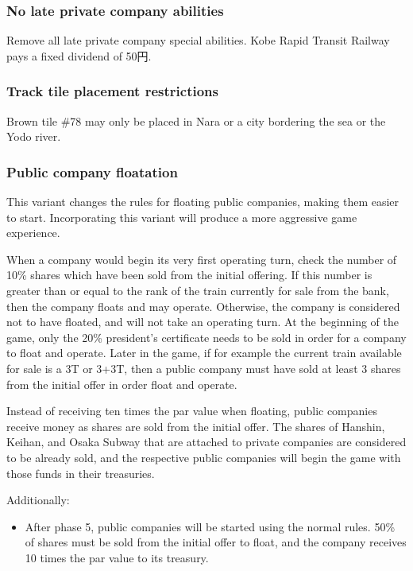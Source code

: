 \documentclass{article}
\begin{document}
\begin{CJK}{UTF8}{min}
\begin{multicols}{2}
\subsubsection{No late private company abilities}
Remove all late private company special abilities. Kobe Rapid Transit
Railway pays a fixed dividend of 50円.

\subsubsection{Track tile placement restrictions}
Brown tile \#78 may only be placed in Nara or a city bordering the sea
or the Yodo river.

\subsubsection{Public company floatation}
This variant changes the rules for floating public companies, making
them easier to start. Incorporating this variant will produce a more
aggressive game experience.

When a company would begin its very first operating turn, check the
number of 10\% shares which have been sold from the initial
offering. If this number is greater than or equal to the rank of the
train currently for sale from the bank, then the company floats and
may operate. Otherwise, the company is considered not to have floated,
and will not take an operating turn. At the beginning of the game,
only the 20\% president's certificate needs to be sold in order for a
company to float and operate. Later in the game, if for example the
current train available for sale is a 3T or 3+3T, then a public
company must have sold at least 3 shares from the initial offer in
order float and operate.

Instead of receiving ten times the par value when floating, public
companies receive money as shares are sold from the initial offer. The
shares of Hanshin, Keihan, and Osaka Subway that are attached to
private companies are considered to be already sold, and the
respective public companies will begin the game with those funds in
their treasuries.

Additionally:
\begin{itemize}

\item After phase 5, public companies will be started using the normal
  rules. 50\% of shares must be sold from the initial offer to float,
  and the company receives 10 times the par value to its treasury.


\end{itemize}
\end{multicols}
\end{CJK}
\end{document}
